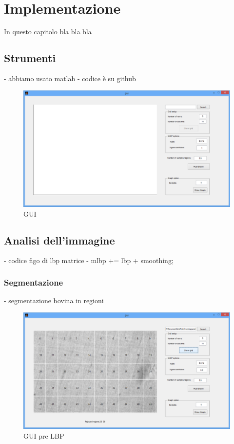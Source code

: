 \section{Implementazione}
In questo capitolo bla bla bla

\subsection{Strumenti}
- abbiamo usato matlab
- codice è su github


\begin{figure}[ht]
\begin{center}
\includegraphics[width=.95\textwidth]{img/gui}
\caption{ GUI }
\label{fig:GUI}
\end{center}
\end{figure}

\subsection{Analisi dell'immagine}
- codice figo di lbp matrice
- mlbp += lbp + smoothing;

\subsubsection{Segmentazione}
- segmentazione bovina in regioni

\begin{figure}[ht]
\begin{center}
\includegraphics[width=.95\textwidth]{img/gui_pre_lbp}
\caption{ GUI pre LBP }
\label{fig:GUIpreLBP}
\end{center}
\end{figure}


